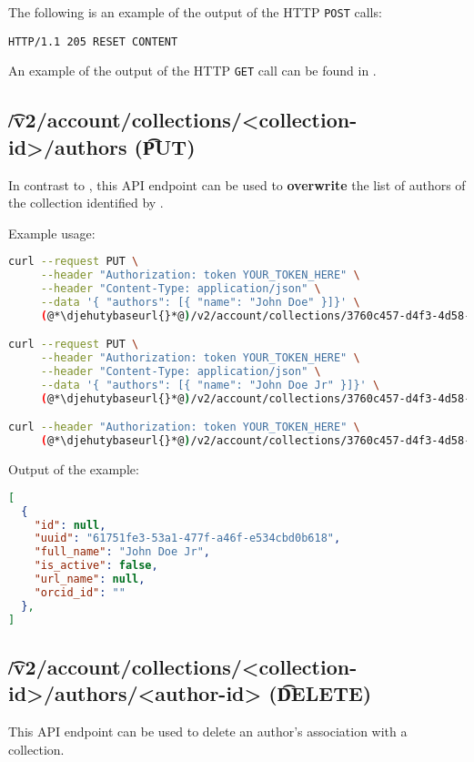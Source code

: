   The following is an example of the output of the HTTP \texttt{POST} calls:
\begin{lstlisting}
HTTP/1.1 205 RESET CONTENT
\end{lstlisting}

  An example of the output of the HTTP \texttt{GET} call can be found in
  .

\subsection{\t{/v2/account/collections/<collection-id>/authors} (\t{PUT})}

  In contrast to , this API endpoint
  can be used to \textbf{overwrite} the list of authors of the collection identified
  by .

  Example usage:
\begin{lstlisting}[language=bash]
curl --request PUT \
     --header "Authorization: token YOUR_TOKEN_HERE" \
     --header "Content-Type: application/json" \
     --data '{ "authors": [{ "name": "John Doe" }]}' \
     (@*\djehutybaseurl{}*@)/v2/account/collections/3760c457-d4f3-4d58-8b94-af089a97a9b4/authors

curl --request PUT \
     --header "Authorization: token YOUR_TOKEN_HERE" \
     --header "Content-Type: application/json" \
     --data '{ "authors": [{ "name": "John Doe Jr" }]}' \
     (@*\djehutybaseurl{}*@)/v2/account/collections/3760c457-d4f3-4d58-8b94-af089a97a9b4/authors

curl --header "Authorization: token YOUR_TOKEN_HERE" \
     (@*\djehutybaseurl{}*@)/v2/account/collections/3760c457-d4f3-4d58-8b94-af089a97a9b4/authors | jq
\end{lstlisting}

  Output of the example:
\begin{lstlisting}[language=JSON]
[
  {
    "id": null,
    "uuid": "61751fe3-53a1-477f-a46f-e534cbd0b618",
    "full_name": "John Doe Jr",
    "is_active": false,
    "url_name": null,
    "orcid_id": ""
  },
]
\end{lstlisting}

\subsection{\t{/v2/account/collections/<collection-id>/authors/<author-id>} (\t{DELETE})}

  This API endpoint can be used to delete an author's association with a collection.

